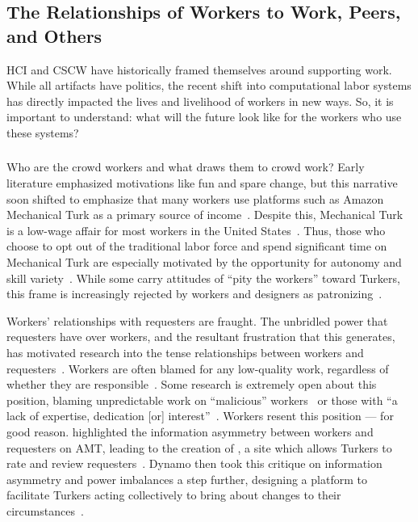 \documentclass[trackingWork]{subfiles}
\begin{document}
\subsection[What will work and the place of work look like for workers]{The Relationships of Workers to Work, Peers, and Others}\label{sec:relationships}

HCI and CSCW have historically framed themselves around supporting work.
While all artifacts have politics,
the recent shift into computational labor systems has directly impacted
the lives and livelihood of workers in new ways.
So, it is important to understand:
what will the future look like for the workers who use these systems?

\subsubsection{\crowdworkpers}
\begin{comment}
	- Workers do it for money
	- Workers coordinate and communicate (gray, being a turker, team stuff). there is mega-drama
	- Workers don't like requesters. have tried to organize
\end{comment}

Who are the crowd workers and what draws them to crowd work?
Early literature emphasized motivations like fun and spare change, but this narrative soon shifted to emphasize that many workers use platforms such as Amazon Mechanical Turk as a primary source of income~\cite{kaufmann2011more,ipeirotis2010demographics,Antin2012a}.
Despite this, Mechanical Turk is a low-wage affair for most workers in the United States~\cite{ipeirotis2010demographics,martin2014being,gupta2014turk}.
Thus, those who choose to opt out of the traditional labor force and spend significant time on Mechanical Turk are especially motivated by the opportunity for autonomy and skill variety~\cite{kaufmann2011more}.
While some carry attitudes of ``pity the workers'' toward Turkers, this frame is increasingly rejected by workers and designers as patronizing~\cite{storiesIraniSilberman}.



Workers' relationships with requesters are fraught.
The unbridled power that requesters have over workers, and
the resultant frustration that this generates,
has motivated research into
the tense relationships between workers and requesters~\cite{fixingChaos,dynamo}.
Workers are often blamed for any low-quality work, regardless of whether they are responsible~\cite{martin2014being,takingAHITMcInnis}.
Some research is extremely open about this position, blaming unpredictable work on ``malicious'' workers~\cite{MaliciousCrowdworkersGadiraju} or those with ``a lack of expertise, dedication [or] interest''~\cite{Sheng:2008:GLI:1401890.1401965}.
Workers resent this position --- for good reason.
\citeauthor{turkopticon} highlighted the information asymmetry between workers and requesters on AMT, leading to the creation of \TO, a site which allows Turkers to rate and review requesters~\cite{turkopticon}.
Dynamo then took this critique on information asymmetry and power imbalances a step further, designing a platform to facilitate
Turkers acting collectively to bring about changes to their circumstances~\cite{dynamo}.
\end{document}
